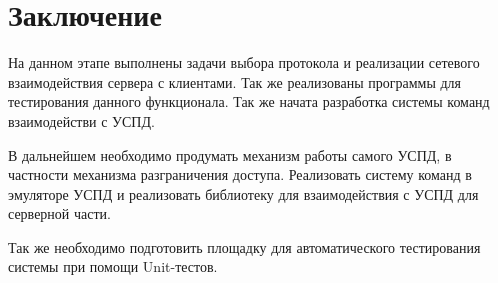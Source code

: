 \newpage
\section{Заключение}

На данном этапе выполнены задачи выбора протокола и реализации сетевого взаимодействия сервера с клиентами. Так же реализованы программы для тестирования данного функционала. Так же начата разработка системы команд взаимодействи с УСПД. 

В дальнейшем необходимо продумать механизм работы самого УСПД, в частности механизма разграничения доступа. Реализовать систему команд в эмуляторе УСПД и реализовать библиотеку для взаимодействия с УСПД для серверной части.

Так же необходимо подготовить площадку для автоматического тестирования системы при помощи Unit-тестов.